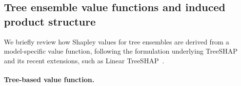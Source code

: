 \documentclass{article}
\newcommand{\cS}{\mathcal{S}}
\newcommand{\x}{\mathbf{x}}
\begin{document}






\subsection{Tree ensemble value functions and induced product structure}
\label{sec:tree_value_function}

We briefly review how Shapley values for tree ensembles are derived from a
model-specific value function, following the formulation underlying TreeSHAP
and its recent extensions, such as Linear TreeSHAP~\cite{linear_treeshap}.

\paragraph{Tree-based value function.}
\end{document}
